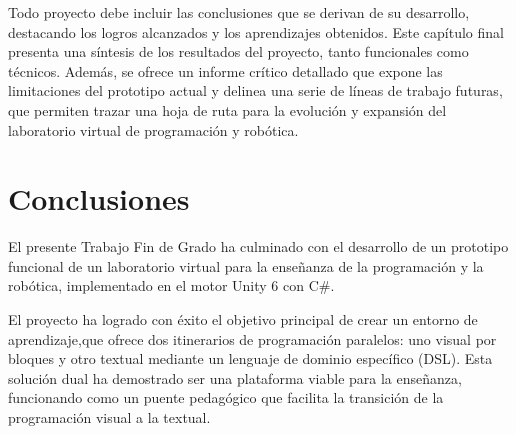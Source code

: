 
Todo proyecto debe incluir las conclusiones que se derivan de su desarrollo, destacando los logros alcanzados y los aprendizajes obtenidos. Este capítulo final presenta una síntesis de los resultados del proyecto, tanto funcionales como técnicos. Además, se ofrece un informe crítico detallado que expone las limitaciones del prototipo actual y delinea una serie de líneas de trabajo futuras, que permiten trazar una hoja de ruta para la evolución y expansión del laboratorio virtual de programación y robótica.

\section{Conclusiones}

El presente Trabajo Fin de Grado ha culminado con el desarrollo de un prototipo funcional de un laboratorio virtual para la enseñanza de la programación y la robótica, implementado en el motor Unity 6 con C\#. 

El proyecto ha logrado con éxito el objetivo principal de crear un entorno de aprendizaje,que ofrece dos itinerarios de programación paralelos: uno visual por bloques y otro textual mediante un lenguaje de dominio específico (DSL). Esta solución dual ha demostrado ser una plataforma viable para la enseñanza, funcionando como un puente pedagógico que facilita la transición de la programación visual a la textual.


